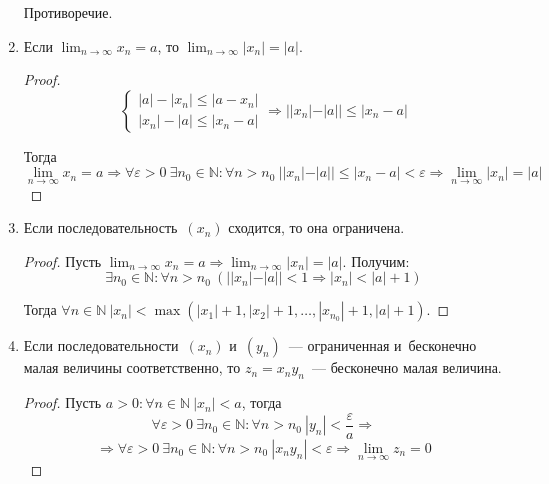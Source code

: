 \begin{enumerate}
\begin{proofcontra}
	Противоречие.
	\end{proofcontra}
	
	\item Если $\displaystyle \lim_{n \to \infty} x_n = a$, то $\displaystyle \lim_{n \to \infty} |x_n| = |a|$.
	\begin{proof}
	\begin{equation*}
	\begin{cases}
	|a| - |x_n| \leqslant |a - x_n| \\
	|x_n| - |a| \leqslant |x_n - a|
	\end{cases}
	\Rightarrow ||x_n| - |a|| \leqslant |x_n - a|
	\end{equation*}
	
	Тогда
	\begin{equation*}
	\lim_{n \to \infty} x_n = a \Rightarrow
	\forall \varepsilon > 0 \ \exists n_0 \in \mathbb N \colon \forall n > n_0 \ ||x_n| - |a|| \leqslant |x_n - a| < \varepsilon \Rightarrow
	\lim_{n \to \infty} |x_n| = |a|
	\end{equation*}
	\end{proof}
	
	\item Если последовательность~$(x_n)$ сходится, то она ограничена.
	\begin{proof}
	Пусть $\displaystyle \lim_{n \to \infty} x_n = a \Rightarrow \lim_{n \to \infty} |x_n| = |a|$.
	Получим:
	\begin{equation*}
	\exists n_0 \in \mathbb N \colon \forall n > n_0 \ (||x_n| - |a|| < 1 \Rightarrow |x_n| < |a| + 1)
	\end{equation*}
	
	Тогда $\forall n \in \mathbb N \ |x_n| < \max(|x_1| + 1, |x_2| + 1, \ldots, |x_{n_0}| + 1, |a| + 1)$.
	\end{proof}
	
	\item Если последовательности~$(x_n)$ и~$(y_n)$~--- ограниченная и~бесконечно малая величины соответственно, то $z_n = x_n y_n$~--- бесконечно малая величина.
	\begin{proof}
	Пусть $a > 0 \colon \forall n \in \mathbb N \ |x_n| < a$, тогда
	\begin{equation*}
	\forall \varepsilon > 0 \ \exists n_0 \in \mathbb N \colon \forall n > n_0 \ |y_n| < \frac\varepsilon{a} \Rightarrow
	\end{equation*}
	\begin{equation*}
	\Rightarrow \forall \varepsilon > 0 \ \exists n_0 \in \mathbb N \colon \forall n > n_0 \ |x_n y_n| < \varepsilon \Rightarrow \lim_{n \to \infty} z_n = 0
	\end{equation*}
	\end{proof}
	

\end{enumerate}
